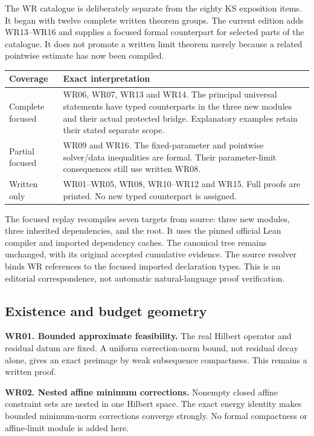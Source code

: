 \clearpage
{}\label{app:written}
The WR catalogue is deliberately separate from the eighty KS exposition items. It began with twelve complete written theorem groups. The current edition adds WR13--WR16 and supplies a focused formal counterpart for selected parts of the catalogue. It does not promote a written limit theorem merely because a related pointwise estimate has now been compiled.

\begin{center}
\begin{tabularx}{\linewidth}{@{}p{.19\linewidth}X@{}}
\toprule Coverage & Exact interpretation\\\midrule
Complete focused & WR06, WR07, WR13 and WR14. The principal universal statements have typed counterparts in the three new modules and their actual protected bridge. Explanatory examples retain their stated separate scope.\\[5pt]
Partial focused & WR09 and WR16. The fixed-parameter and pointwise solver/data inequalities are formal. Their parameter-limit consequences still use written WR08.\\[5pt]
Written only & WR01--WR05, WR08, WR10--WR12 and WR15. Full proofs are printed. No new typed counterpart is assigned.\\\bottomrule
\end{tabularx}
\end{center}

The focused replay recompiles seven targets from source: three new modules, three inherited dependencies, and the root. It uses the pinned official Lean compiler and imported dependency caches. The canonical  tree remains unchanged, with its original accepted cumulative evidence. The source resolver binds WR references to the focused imported declaration types. This is an editorial correspondence, not automatic natural-language proof verification.

\subsection{Existence and budget geometry}
\textbf{WR01. Bounded approximate feasibility.} The real Hilbert operator and residual datum are fixed. A uniform correction-norm bound, not residual decay alone, gives an exact preimage by weak subsequence compactness. This remains a written proof.

\textbf{WR02. Nested affine minimum corrections.} Nonempty closed affine constraint sets are nested in one Hilbert space. The exact energy identity makes bounded minimum-norm corrections converge strongly. No formal compactness or affine-limit module is added here.

